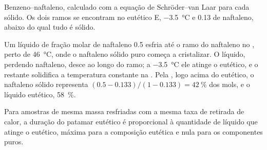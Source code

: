 \begin{omfigure}

{\small Benzeno--naftaleno, calculado com a equação de Schröder--van Laar
para cada sólido. Os dois ramos se encontram no eutético E,
\qty{-3.5}{\degreeCelsius} e 0.13 de naftaleno, abaixo do qual tudo é sólido.}
\end{omfigure}

\begin{example}\label{ex:b2:solid-liquid-diagrams:naphthalene}
Um líquido de fração molar de naftaleno 0.5 esfria até o ramo do naftaleno
no , perto de \qty{46}{\degreeCelsius}, onde o naftaleno sólido puro
começa a cristalizar. O líquido, perdendo naftaleno, desce ao longo do ramo;
a \qty{-3.5}{\degreeCelsius} ele atinge o eutético, e o restante solidifica a
temperatura constante na . Pela , logo
acima do eutético, o naftaleno sólido representa $(0.5 - 0.133)/(1 - 0.133) =
42~\%$ dos mols, e o líquido eutético, 58~\%.
\end{example}

\begin{proposition}\label{prop:b2:solid-liquid-diagrams:plateau-length}
Para amostras de mesma massa resfriadas com a mesma taxa de retirada de calor,
a duração do patamar eutético é proporcional à quantidade de líquido que
atinge o eutético, máxima para a composição eutética e nula para os
componentes puros.
\end{proposition}

